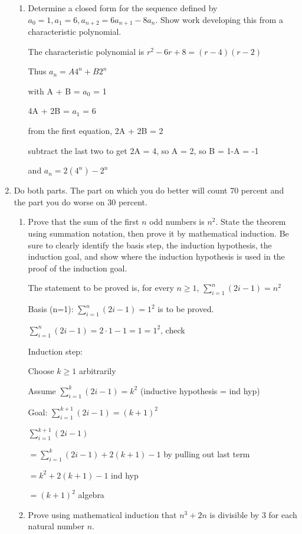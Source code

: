 \documentclass[12pt]{article}
\begin{document}
\begin{enumerate}
\begin{enumerate}
\item  Determine a closed form for the sequence defined by $a_0 =1, a_1=6, a_{n+2}=6a_{n+1}-8a_n$.  Show work developing this from a characteristic polynomial.

The characteristic polynomial is $r^2-6r+8 = (r-4)(r-2)$

Thus $a_n = A4^n + B2^n$

with A + B = $a_0$ = 1

4A + 2B = $a_1$ = 6

from the first equation, 2A + 2B = 2

subtract the last two to get 2A = 4, so A = 2, so B = 1-A = -1

and $a_n = 2(4^n) - 2^n$

\end{enumerate}

\newpage

\item   Do both parts.  The part on which you do better will count 70 percent and the part you do worse on 30 percent.

\begin{enumerate}

\item  Prove that the sum of the first $n$ odd numbers is $n^2$.  State the theorem using summation notation, then prove it by mathematical induction.
Be sure to clearly identify the basis step, the induction hypothesis, the induction goal, and show where the induction hypothesis is used in the proof of the induction goal.


The statement to be proved is, for every $n \geq 1$, $\sum_{i=1}^n(2i - 1) = n^2$

Basis (n=1):  $\sum_{i=1}^n(2i - 1) = 1^2$ is to be proved.

$\sum_{i=1}^n(2i - 1) = 2 \cdot 1-1 = 1 = 1^2$, check

Induction step:

Choose $k \geq 1$ arbitrarily

Assume $\sum_{i=1}^k(2i - 1) = k^2$ (inductive hypothesis = ind hyp)

Goal:  $\sum_{i=1}^{k+1}(2i - 1) = (k+1)^2$

$\sum_{i=1}^{k+1}(2i - 1)$

$= \sum_{i=1}^{k}(2i - 1) + 2(k+1)-1$   by pulling out last term

$= k^2 + 2(k+1)-1$  ind hyp

$=(k+1)^2$ algebra


\item  Prove using mathematical induction that $n^3 + 2n$ is divisible by 3 for each natural number $n$.


\end{enumerate}
\end{enumerate}
\end{document}
